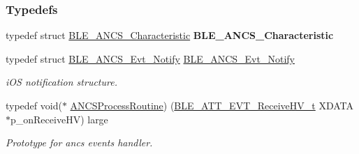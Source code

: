 \subsubsection*{Typedefs}
\begin{DoxyCompactItemize}
\item 
typedef struct \hyperlink{struct_b_l_e___a_n_c_s___characteristic}{B\+L\+E\+\_\+\+A\+N\+C\+S\+\_\+\+Characteristic} {\bfseries B\+L\+E\+\_\+\+A\+N\+C\+S\+\_\+\+Characteristic}\hypertarget{group___b_l_e___a_n_c_s_ga80e79b974367dc36bc43229e9a063811}{}\label{group___b_l_e___a_n_c_s_ga80e79b974367dc36bc43229e9a063811}

\item 
typedef struct \hyperlink{struct_b_l_e___a_n_c_s___evt___notify}{B\+L\+E\+\_\+\+A\+N\+C\+S\+\_\+\+Evt\+\_\+\+Notify} \hyperlink{group___b_l_e___a_n_c_s_ga0bd8e932a1dc9ec48e78a8708db270fc}{B\+L\+E\+\_\+\+A\+N\+C\+S\+\_\+\+Evt\+\_\+\+Notify}\hypertarget{group___b_l_e___a_n_c_s_ga0bd8e932a1dc9ec48e78a8708db270fc}{}\label{group___b_l_e___a_n_c_s_ga0bd8e932a1dc9ec48e78a8708db270fc}

\begin{DoxyCompactList}\small\item\em i\+OS notification structure. \end{DoxyCompactList}\item 
typedef void($\ast$ \hyperlink{group___b_l_e___a_n_c_s_ga191b977bd0c8b7328a6a1c5ef65c76b2}{A\+N\+C\+S\+Process\+Routine}) (\hyperlink{struct_b_l_e___a_t_t___e_v_t___receive_h_v__t}{B\+L\+E\+\_\+\+A\+T\+T\+\_\+\+E\+V\+T\+\_\+\+Receive\+H\+V\+\_\+t} X\+D\+A\+TA $\ast$p\+\_\+on\+Receive\+HV) large\hypertarget{group___b_l_e___a_n_c_s_ga191b977bd0c8b7328a6a1c5ef65c76b2}{}\label{group___b_l_e___a_n_c_s_ga191b977bd0c8b7328a6a1c5ef65c76b2}

\begin{DoxyCompactList}\small\item\em Prototype for ancs events handler. \end{DoxyCompactList}\end{DoxyCompactItemize}
